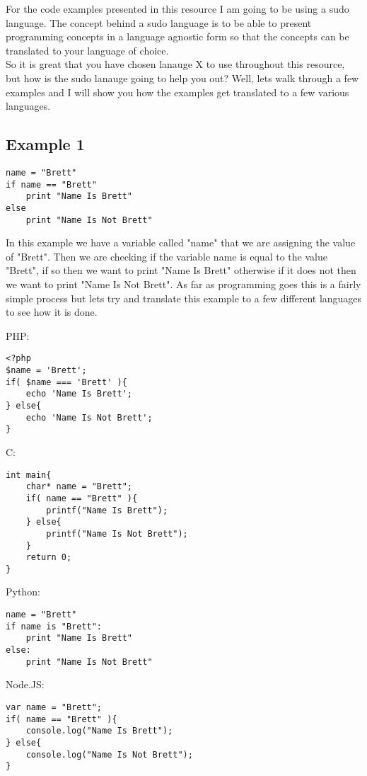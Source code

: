 For the code examples presented in this resource I am going to be using a sudo language. The concept behind a sudo language
is to be able to present programming concepts in a language agnostic form so that the concepts can be translated to your
language of choice.
\newline
\\
So it is great that you have chosen lanauge X to use throughout this resource, but how is the sudo lanauge going to help you out?
Well, lets walk through a few examples and I will show you how the examples get translated to a few various languages.

\subsection{Example 1}
\begin{lstlisting}
name = "Brett"
if name == "Brett"
    print "Name Is Brett"
else
    print "Name Is Not Brett"
\end{lstlisting}

In this example we have a variable called "name" that we are assigning the value of "Brett". Then we are checking if the
variable name is equal to the value "Brett", if so then we want to print "Name Is Brett" otherwise if it does not then we want to 
print "Name Is Not Brett". As far as programming goes this is a fairly simple process but lets try and translate this example
to a few different languages to see how it is done.

PHP:
\begin{lstlisting}
<?php
$name = 'Brett';
if( $name === 'Brett' ){
    echo 'Name Is Brett';
} else{
    echo 'Name Is Not Brett';
}
\end{lstlisting}

C:
\begin{lstlisting}
int main{
    char* name = "Brett";
    if( name == "Brett" ){
        printf("Name Is Brett");
    } else{
        printf("Name Is Not Brett");
    }
    return 0;
}
\end{lstlisting}

Python:
\begin{lstlisting}
name = "Brett"
if name is "Brett":
    print "Name Is Brett"
else:
    print "Name Is Not Brett"
\end{lstlisting}

Node.JS:
\begin{lstlisting}
var name = "Brett";
if( name == "Brett" ){
    console.log("Name Is Brett");
} else{
    console.log("Name Is Not Brett");
}
\end{lstlisting}


